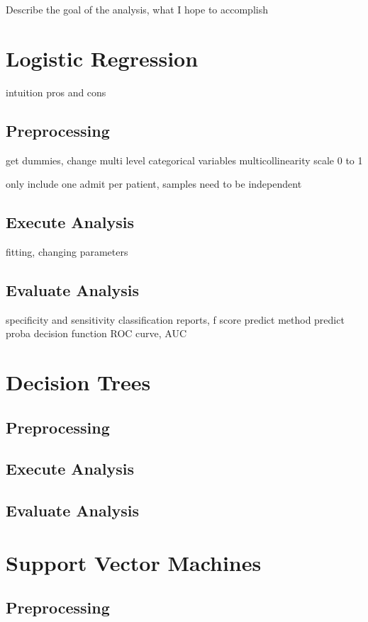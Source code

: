 \documentclass[sigconf]{acmart}
\begin{document}
Describe the goal of the analysis, what I hope to accomplish

\section{Logistic Regression}

intuition
pros and cons

\subsection{Preprocessing}
get dummies, change multi level categorical variables
multicollinearity
scale 0 to 1

only include one admit per patient, samples need to be independent

\subsection{Execute Analysis}
fitting, changing parameters

\subsection{Evaluate Analysis}
specificity and sensitivity
classification reports, f score
predict method
predict proba
decision function
ROC curve, AUC

\section{Decision Trees}

\subsection{Preprocessing}

\subsection{Execute Analysis}

\subsection{Evaluate Analysis}


\section{Support Vector Machines}

\subsection{Preprocessing}
\end{document}
